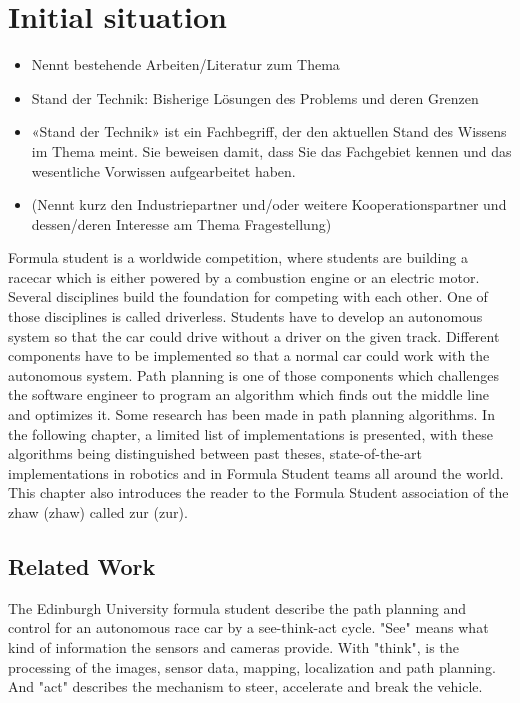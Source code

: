 \section{Initial situation}

\begin{itemize}
    \item Nennt bestehende Arbeiten/Literatur zum Thema
    \item Stand der Technik: Bisherige Lösungen des Problems und deren Grenzen
    \item «Stand der Technik» ist ein Fachbegriff, der den aktuellen Stand des Wissens im Thema meint. Sie beweisen damit, dass Sie das Fachgebiet kennen und das wesentliche Vorwissen aufgearbeitet haben.
    \item (Nennt kurz den Industriepartner und/oder weitere Kooperationspartner und dessen/deren Interesse am Thema Fragestellung)
\end{itemize}

Formula student is a worldwide competition, where students are building a racecar which is either powered by a combustion engine or an electric motor. Several disciplines build the foundation for competing with each other. One of those disciplines is called driverless. Students have to develop an autonomous system so that the car could drive without a driver on the given track. Different components have to be implemented so that a normal car could work with the autonomous system. Path planning is one of those components which challenges the software engineer to program an algorithm which finds out the middle line and optimizes it. Some research has been made in path planning algorithms. In the following chapter, a limited list of implementations is presented, with these algorithms being distinguished between past theses, state-of-the-art implementations in robotics and in Formula Student teams all around the world. This chapter also introduces the reader to the Formula Student association of the \acrlong{zhaw} (\acrshort{zhaw}) called \acrlong{zur} (\acrshort{zur}).

\subsection{Related Work}

The Edinburgh University formula student describe the path planning and control for an autonomous race car by a see-think-act cycle. "See" means what kind of information the sensors and cameras provide. With "think", is the processing of the images, sensor data, mapping, localization and path planning. And "act" describes the mechanism to steer, accelerate and break the vehicle.

